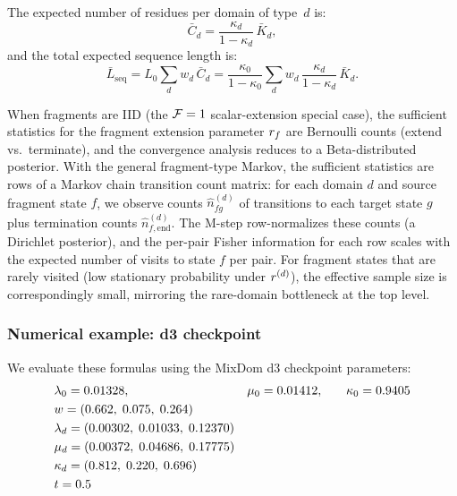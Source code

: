 The expected number of residues per domain of type~$d$ is:
\begin{equation}\label{eq:chars-per-domain}
\bar{C}_d = \frac{\kappa_d}{1-\kappa_d}\, \bar{K}_d,
\end{equation}
and the total expected sequence length is:
\begin{equation}\label{eq:total-length}
\bar{L}_{\text{seq}} = L_0 \sum_d w_d\,\bar{C}_d
  = \frac{\kappa_0}{1-\kappa_0}
    \sum_d w_d\,\frac{\kappa_d}{1-\kappa_d}\, \bar{K}_d.
\end{equation}

\begin{remark}
When fragments are IID (the $\mathcal{F} = 1$ scalar-extension special
case), the sufficient statistics for the fragment extension parameter
$r_f$ are Bernoulli counts (extend vs.\ terminate), and the
convergence analysis reduces to a Beta-distributed posterior.
With the general fragment-type Markov, the sufficient statistics are
rows of a Markov chain transition count matrix: for each domain $d$
and source fragment state $f$, we observe
counts $\hat{n}^{(d)}_{fg}$ of transitions to each target state $g$
plus termination counts $\hat{n}^{(d)}_{f,\text{end}}$.
The M-step row-normalizes these counts (a Dirichlet posterior), and the
per-pair Fisher information for each row scales with the expected number
of visits to state $f$ per pair. For fragment states that are rarely
visited (low stationary probability under $r^{(d)}$), the effective
sample size is correspondingly small, mirroring the rare-domain bottleneck
at the top level.
\end{remark}


\subsubsection{Numerical example: d3 checkpoint}

We evaluate these formulas using the MixDom d3 checkpoint parameters:
\begin{alignat*}{3}
&\lambda_0 = 0.01328, \quad &&\mu_0 = 0.01412,
  \quad &&\kappa_0 = 0.9405 \\
&w = (0.662,\; 0.075,\; 0.264) \\
&\lambda_d = (0.00302,\; 0.01033,\; 0.12370) \\
&\mu_d = (0.00372,\; 0.04686,\; 0.17775) \\
&\kappa_d = (0.812,\; 0.220,\; 0.696) \\
&t = 0.5
\end{alignat*}

